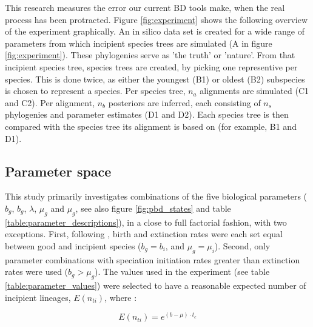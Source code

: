 \documentclass{article}
\begin{document}
This research measures the error our current BD tools make, when
the real process has been protracted. Figure \ref{fig:experiment} shows
the following overview of the experiment graphically.
An in silico data set is created for a wide
range of parameters from which incipient species trees are simulated (A in figure \ref{fig:experiment}). 
These phylogenies serve as 'the truth' or 'nature'. From that incipient species tree,
species trees are created, by picking one representive per species.
This is done twice, as either the youngest (B1) or oldest (B2) subspecies is chosen
to represent a species. Per species tree, $n_a$ alignments are simulated (C1 and C2).
Per alignment, $n_b$ posteriors are inferred, 
each consisting of $n_s$ phylogenies and parameter estimates (D1 and D2). Each
species tree is then compared with the species tree its alignment is based on (for
example, B1 and D1).

\subsection{Parameter space}
\label{subsec:parameter_space}





This study primarily investigates combinations of the five biological 
parameters ($b_g$, $b_g$, $\lambda$, $\mu_g$ and $\mu_g$, 
see also figure \ref{fig:pbd_states} and table \ref{table:parameter_descriptions}), 
in a close to full factorial fashion, with two exceptions.
First, following \cite{etienne2014estimating}, birth and extinction rates were each 
set equal between good and incipient species ($b_g = b_i$, and $\mu_g = \mu_i$).
Second, only parameter combinations with speciation initiation rates greater
than extinction rates were used ($b_g > \mu_g$). The values 
used in the experiment (see table \ref{table:parameter_values}) 
were selected to have a reasonable expected number of incipient 
lineages, $E(n_{ti})$, where : 

\begin{equation}
  E(n_{ti}) = e^{ (b - \mu) \cdot t_c }
\end{equation}
\end{document}
